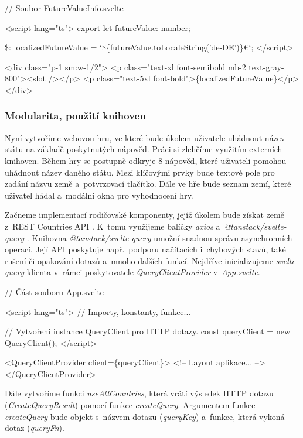 \begin{prog}
// Soubor FutureValueInfo.svelte
  
<script lang="ts">
  export let futureValue: number;

  \$: localizedFutureValue = `\$\{futureValue.toLocaleString('de-DE')\}€`;
</script>

<div class="p-1 sm:w-1/2">
  <p class="text-xl font-semibold mb-2 text-gray-800"><slot /></p>
  <p class="text-5xl font-bold">\{localizedFutureValue\}</p>
</div>
\end{prog}

\subsubsection*{Modularita, použití knihoven}

Nyní vytvoříme webovou hru, ve které bude úkolem uživatele uhádnout název státu na základě poskytnutých nápověd. Práci si zlehčíme využitím externích knihoven. 
Během hry se postupně odkryje 8 nápověd, které uživateli pomohou uhádnout název daného státu. Mezi klíčovými prvky bude textové pole pro zadání názvu země a~potvrzovací tlačítko. 
Dále ve hře bude seznam zemí, které uživatel hádal a~modální okna pro vyhodnocení hry.

Začneme implementací rodičovské komponenty, jejíž úkolem bude získat země z~REST Countries API \cite{restcountriesapi}. 
K~tomu využijeme balíčky \emph{axios} \cite{axioslib} a~\emph{@tanstack/svelte-query} \cite{tanstackquerylib}. 
Knihovna \emph{@tanstack/svelte-query} umožní snadnou správu asynchronních operací. Její API poskytuje např.~podporu načítacích i~chybových stavů, také rušení či opakování dotazů a~mnoho dalších funkcí. 
Nejdříve inicializujeme \emph{svelte-query} klienta v~rámci poskytovatele \emph{QueryClientProvider} v~\emph{App.svelte}.

\begin{prog}
// Část souboru App.svelte

<script lang="ts">
  // Importy, konstanty, funkce...  

  // Vytvoření instance QueryClient pro HTTP dotazy.
  const queryClient = new QueryClient();
</script>

<QueryClientProvider client=\{queryClient\}>
  <!-- Layout aplikace... -->
</QueryClientProvider>
\end{prog}

Dále vytvoříme funkci \emph{useAllCountries}, která vrátí výsledek HTTP dotazu (\emph{CreateQueryResult}) pomocí funkce \emph{createQuery}. 
Argumentem funkce \emph{createQuery} bude objekt s~názvem dotazu (\emph{queryKey}) a~funkce, která vykoná dotaz (\emph{queryFn}).

